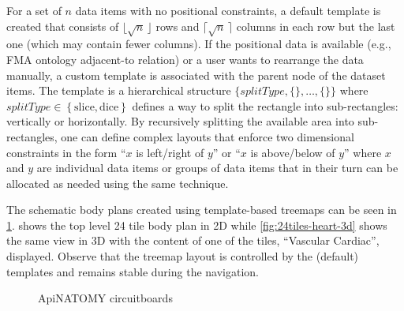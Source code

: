 For a set of $n$ data items with no positional constraints, a default template is created that consists of $\lfloor \sqrt{n}\, \rfloor$ rows and $\lceil \sqrt{n}\, \rceil$ columns in each row but the last one (which may contain fewer columns). If the positional data is available (e.g., FMA ontology adjacent-to relation) or a user wants to rearrange the data manually, a custom template is associated with the parent node of the dataset items. The template is a hierarchical structure
$\bigl\{\mathit{splitType}, \{\},\ldots, \{\}\bigr\}$ where $\mathit{splitType} \in \left\{\mathrm{slice}, \mathrm{dice}\right\}$ defines a way to split the rectangle into sub-rectangles: vertically or horizontally. By recursively splitting the available area into sub-rectangles, one can define complex layouts that enforce two dimensional constraints in the form ``$x$ is left/right of $y$'' or ``$x$ is above/below of $y$'' where $x$ and $y$ are individual data items or groups of data items that in their turn can be allocated as needed using the same technique.

The schematic body plans created using template-based treemaps can be seen in \cref{fig:treemaps}.  shows the top level 24 tile body plan in 2D while \cref{fig:24tiles-heart-3d} shows the same view in 3D with the content of one of the tiles, ``Vascular Cardiac'', displayed. Observe that the treemap layout is controlled by the (default) templates and remains stable during the navigation.

\begin{figure}%
  \centering%
  \caption{ApiNATOMY circuitboards}
  \label{fig:treemaps}
\end{figure}


